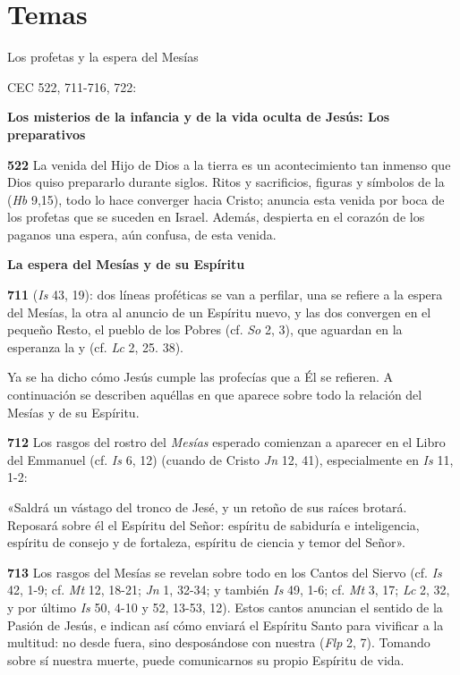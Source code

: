 \section{Temas}

Los profetas y la espera del Mesías

CEC 522, 711-716, 722:

\textbf{Los misterios de la infancia y de la vida oculta de Jesús: Los preparativos}

\textbf{522} La venida del Hijo de Dios a la tierra es un acontecimiento tan inmenso que Dios quiso prepararlo durante siglos. Ritos y sacrificios, figuras y símbolos de la  (\emph{Hb} 9,15), todo lo hace converger hacia Cristo; anuncia esta venida por boca de los profetas que se suceden en Israel. Además, despierta en el corazón de los paganos una espera, aún confusa, de esta venida.

\textbf{La espera del Mesías y de su Espíritu}

\textbf{711}  (\emph{Is} 43, 19): dos líneas proféticas se van a perfilar, una se refiere a la espera del Mesías, la otra al anuncio de un Espíritu nuevo, y las dos convergen en el pequeño Resto, el pueblo de los Pobres (cf. \emph{So} 2, 3), que aguardan en la esperanza la  y  (cf. \emph{Lc} 2, 25. 38).

Ya se ha dicho cómo Jesús cumple las profecías que a Él se refieren. A continuación se describen aquéllas en que aparece sobre todo la relación del Mesías y de su Espíritu.

\textbf{712} Los rasgos del rostro del \emph{Mesías} esperado comienzan a aparecer en el Libro del Emmanuel (cf. \emph{Is} 6, 12) (cuando  de Cristo \emph{Jn} 12, 41), especialmente en \emph{Is} 11, 1-2:

«Saldrá un vástago del tronco de Jesé, y un retoño de sus raíces brotará. Reposará sobre él el Espíritu del Señor: espíritu de sabiduría e inteligencia, espíritu de consejo y de fortaleza, espíritu de ciencia y temor del Señor».

\textbf{713} Los rasgos del Mesías se revelan sobre todo en los Cantos del Siervo (cf. \emph{Is} 42, 1-9; cf. \emph{Mt} 12, 18-21; \emph{Jn} 1, 32-34; y también \emph{Is} 49, 1-6; cf. \emph{Mt} 3, 17; \emph{Lc} 2, 32, y por último \emph{Is} 50, 4-10 y 52, 13-53, 12). Estos cantos anuncian el sentido de la Pasión de Jesús, e indican así cómo enviará el Espíritu Santo para vivificar a la multitud: no desde fuera, sino desposándose con nuestra  (\emph{Flp} 2, 7). Tomando sobre sí nuestra muerte, puede comunicarnos su propio Espíritu de vida.

